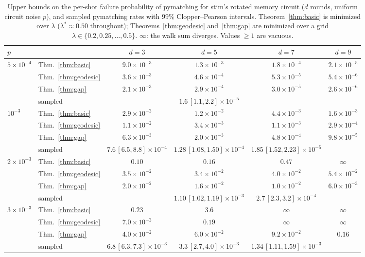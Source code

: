 \documentclass[11pt]{article}
\theoremstyle{plain}
\theoremstyle{definition}
\theoremstyle{remark}
\renewcommand{\_}{\oldunderscore\allowbreak}
\begin{document}
\begin{table}[!htb]
\centering\small\setlength{\tabcolsep}{4pt}
\begin{tabular}{llcccc}
\toprule
$p$ & & $d=3$ & $d=5$ & $d=7$ & $d=9$\\
\midrule
$5\times10^{-4}$ & Thm.~\ref{thm:basic} & $9.0\times10^{-3}$ & $1.3\times10^{-3}$ & $1.8\times10^{-4}$ & $2.1\times10^{-5}$\\
 & Thm.~\ref{thm:geodesic} & $3.6\times10^{-3}$ & $4.6\times10^{-4}$ & $5.3\times10^{-5}$ & $5.4\times10^{-6}$\\
 & Thm.~\ref{thm:gap} & $2.1\times10^{-3}$ & $2.9\times10^{-4}$ & $3.0\times10^{-5}$ & $2.6\times10^{-6}$\\
 & sampled & & $1.6\,[1.1,2.2]\times10^{-5}$ & & \\
\midrule
$10^{-3}$ & Thm.~\ref{thm:basic} & $2.9\times10^{-2}$ & $1.2\times10^{-2}$ & $4.4\times10^{-3}$ & $1.6\times10^{-3}$\\
 & Thm.~\ref{thm:geodesic} & $1.1\times10^{-2}$ & $3.4\times10^{-3}$ & $1.1\times10^{-3}$ & $2.9\times10^{-4}$\\
 & Thm.~\ref{thm:gap} & $6.3\times10^{-3}$ & $2.0\times10^{-3}$ & $4.8\times10^{-4}$ & $9.8\times10^{-5}$\\
 & sampled & $7.6\,[6.5,8.8]\times10^{-4}$ & $1.28\,[1.08,1.50]\times10^{-4}$ & $1.85\,[1.52,2.23]\times10^{-5}$ & \\
\midrule
$2\times10^{-3}$ & Thm.~\ref{thm:basic} & $0.10$ & $0.16$ & $0.47$ & $\infty$\\
 & Thm.~\ref{thm:geodesic} & $3.5\times10^{-2}$ & $3.4\times10^{-2}$ & $4.0\times10^{-2}$ & $5.4\times10^{-2}$\\
 & Thm.~\ref{thm:gap} & $2.0\times10^{-2}$ & $1.6\times10^{-2}$ & $1.0\times10^{-2}$ & $6.0\times10^{-3}$\\
 & sampled & & $1.10\,[1.02,1.19]\times10^{-3}$ & $2.7\,[2.3,3.2]\times10^{-4}$ & \\
\midrule
$3\times10^{-3}$ & Thm.~\ref{thm:basic} & $0.23$ & $3.6$ & $\infty$ & $\infty$\\
 & Thm.~\ref{thm:geodesic} & $7.0\times10^{-2}$ & $0.19$ & $\infty$ & $\infty$\\
 & Thm.~\ref{thm:gap} & $4.0\times10^{-2}$ & $6.0\times10^{-2}$ & $9.2\times10^{-2}$ & $0.16$\\
 & sampled & $6.8\,[6.3,7.3]\times10^{-3}$ & $3.3\,[2.7,4.0]\times10^{-3}$ & $1.34\,[1.11,1.59]\times10^{-3}$ & \\
\bottomrule
\end{tabular}
\caption{Upper bounds on the per-shot failure probability of pymatching for stim's rotated memory circuit ($d$ rounds, uniform circuit noise $p$), and sampled pymatching rates with $99\%$ Clopper--Pearson intervals. Theorem~\ref{thm:basic} is minimized over $\lambda$ ($\lambda^\ast\approx0.50$ throughout); Theorems~\ref{thm:geodesic} and~\ref{thm:gap} are minimized over a grid $\lambda\in\{0.2,0.25,\dots,0.5\}$. $\infty$: the walk sum diverges. Values $\ge1$ are vacuous.}\label{tab:stim}
\end{table}
\end{document}
